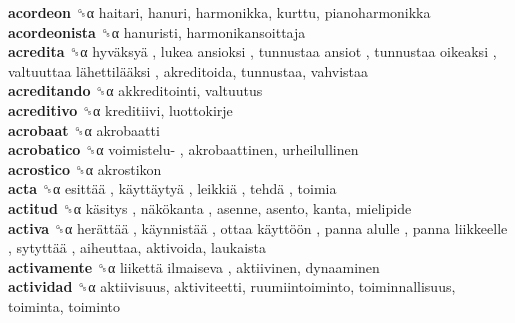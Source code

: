 \textbf{acordeon} ␝α  haitari, hanuri, harmonikka, kurttu, pianoharmonikka  \\
\textbf{acordeonista} ␝α  hanuristi, harmonikansoittaja  \\
\textbf{acredita} ␝α   hyväksyä ,  lukea ansioksi ,  tunnustaa ansiot ,  tunnustaa oikeaksi ,  valtuuttaa lähettilääksi , akreditoida, tunnustaa, vahvistaa  \\
\textbf{acreditando} ␝α  akkreditointi, valtuutus  \\
\textbf{acreditivo} ␝α  kreditiivi, luottokirje  \\
\textbf{acrobaat} ␝α  akrobaatti  \\
\textbf{acrobatico} ␝α   voimistelu- , akrobaattinen, urheilullinen  \\
\textbf{acrostico} ␝α  akrostikon  \\
\textbf{acta} ␝α   esittää ,  käyttäytyä ,  leikkiä ,  tehdä , toimia  \\
\textbf{actitud} ␝α   käsitys ,  näkökanta , asenne, asento, kanta, mielipide  \\
\textbf{activa} ␝α   herättää ,  käynnistää ,  ottaa käyttöön ,  panna alulle ,  panna liikkeelle ,  sytyttää , aiheuttaa, aktivoida, laukaista  \\
\textbf{activamente} ␝α   liikettä ilmaiseva , aktiivinen, dynaaminen  \\
\textbf{actividad} ␝α  aktiivisuus, aktiviteetti, ruumiintoiminto, toiminnallisuus, toiminta, toiminto  \\
